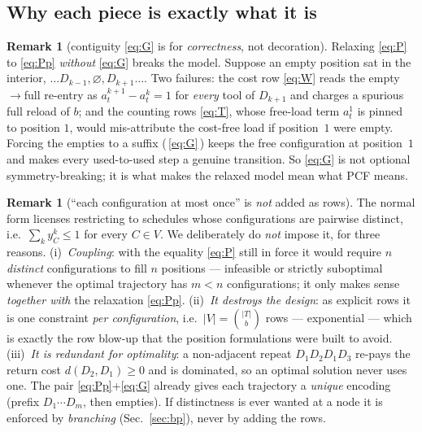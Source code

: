 \documentclass[11pt,a4paper]{article}
\theoremstyle{plain}
\theoremstyle{definition}
\newtheorem{remark}[theorem]{Remark}
\begin{document}
\subsection{Why each piece is exactly what it is}
\begin{remark}[contiguity \eqref{eq:G} is for \emph{correctness}, not decoration]\label{rem:G-needed}
Relaxing \eqref{eq:P} to \eqref{eq:Pp} \emph{without} \eqref{eq:G} breaks the model. Suppose an
empty position sat in the interior, $\dots D_{k-1},\varnothing,D_{k+1}\dots$. Two failures: the
cost row \eqref{eq:W} reads the empty$\to$full re-entry as $a_t^{k+1}-a_t^k=1$ for \emph{every}
tool of $D_{k+1}$ and charges a spurious full reload of $b$; and the counting rows \eqref{eq:T},
whose free-load term $a_t^1$ is pinned to position $1$, would mis-attribute the cost-free load if
position~$1$ were empty. Forcing the empties to a suffix (\,\eqref{eq:G}\,) keeps the free
configuration at position~$1$ and makes every used-to-used step a genuine transition. So
\eqref{eq:G} is not optional symmetry-breaking; it is what makes the relaxed model mean what PCF
means.
\end{remark}

\begin{remark}[``each configuration at most once'' is \emph{not} added as rows]\label{rem:once}
The normal form licenses restricting to schedules whose configurations are pairwise distinct,
i.e.\ $\sum_k y_C^k\le1$ for every $C\in V$. We deliberately do \emph{not} impose it, for three
reasons. (i)~\emph{Coupling}: with the equality \eqref{eq:P} still in force it would require $n$
\emph{distinct} configurations to fill $n$ positions --- infeasible or strictly suboptimal
whenever the optimal trajectory has $m<n$ configurations; it only makes sense \emph{together
with} the relaxation \eqref{eq:Pp}. (ii)~\emph{It destroys the design}: as explicit rows it is
one constraint \emph{per configuration}, i.e.\ $|V|=\binom{|T|}{b}$ rows --- exponential ---
which is exactly the row blow-up that the position formulations were built to avoid. (iii)~\emph{It
is redundant for optimality}: a non-adjacent repeat $D_1D_2D_1D_3$ re-pays the return cost
$d(D_2,D_1)\ge0$ and is dominated, so an optimal solution never uses one. The pair
\eqref{eq:Pp}+\eqref{eq:G} already gives each trajectory a \emph{unique} encoding (prefix
$D_1\cdots D_m$, then empties). If distinctness is ever wanted at a node it is enforced by
\emph{branching} (Sec.~\ref{sec:bp}), never by adding the rows.
\end{remark}
\end{document}
